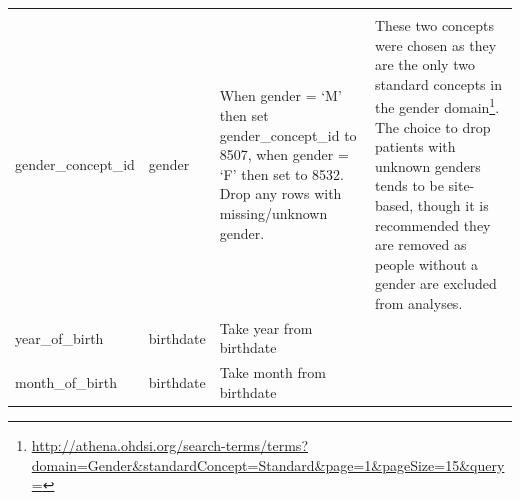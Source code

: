 \documentclass[11pt]{book}
\let\rmarkdownfootnote\footnote%
\def\footnote{\protect\rmarkdownfootnote}
\theoremstyle{definition}
\theoremstyle{definition}
\theoremstyle{definition}
\theoremstyle{remark}
\begin{document}
\begin{longtable}[]{@{}llll@{}}
\begin{minipage}[t]{0.42\columnwidth}
\end{minipage}\tabularnewline
\begin{minipage}[t]{0.24\columnwidth}\raggedright
gender\_concept\_id\strut
\end{minipage} & \begin{minipage}[t]{0.10\columnwidth}\raggedright
gender\strut
\end{minipage} & \begin{minipage}[t]{0.12\columnwidth}\raggedright
When gender = `M' then set gender\_concept\_id to 8507, when gender = `F' then set to 8532. Drop any rows with missing/unknown gender.\strut
\end{minipage} & \begin{minipage}[t]{0.42\columnwidth}\raggedright
These two concepts were chosen as they are the only two standard concepts in the gender domain\footnote{\url{http://athena.ohdsi.org/search-terms/terms?domain=Gender\&standardConcept=Standard\&page=1\&pageSize=15\&query=}}. The choice to drop patients with unknown genders tends to be site-based, though it is recommended they are removed as people without a gender are excluded from analyses.\strut
\end{minipage}\tabularnewline
\begin{minipage}[t]{0.24\columnwidth}\raggedright
year\_of\_birth\strut
\end{minipage} & \begin{minipage}[t]{0.10\columnwidth}\raggedright
birthdate\strut
\end{minipage} & \begin{minipage}[t]{0.12\columnwidth}\raggedright
Take year from birthdate\strut
\end{minipage} & \begin{minipage}[t]{0.42\columnwidth}\raggedright
\strut
\end{minipage}\tabularnewline
\begin{minipage}[t]{0.24\columnwidth}\raggedright
month\_of\_birth\strut
\end{minipage} & \begin{minipage}[t]{0.10\columnwidth}\raggedright
birthdate\strut
\end{minipage} & \begin{minipage}[t]{0.12\columnwidth}\raggedright
Take month from birthdate\strut
\end{minipage} & \begin{minipage}[t]{0.42\columnwidth}\raggedright
\strut
\end{minipage}\tabularnewline

\end{longtable}
\end{document}
